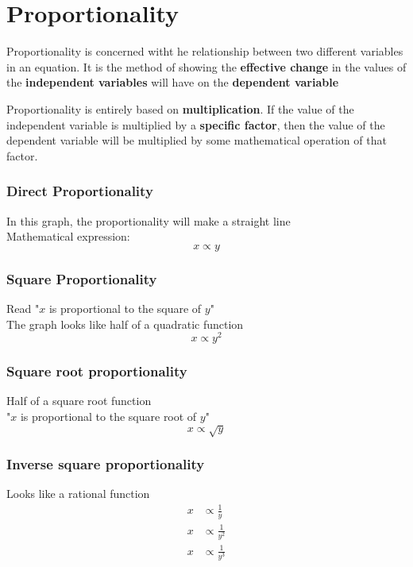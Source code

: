 \section{Proportionality}
\begin{definition}
    Proportionality is concerned witht he relationship between two different variables in an equation. It is the method 
    of showing the \textbf{effective change} in the values of the \textbf{independent variables} will have on the \textbf{dependent variable}
\end{definition}

Proportionality is entirely based on \textbf{multiplication}. If the value of the independent variable is multiplied by a 
\textbf{specific factor}, then the value of the dependent variable will be multiplied by some mathematical operation of that factor. 

\subsubsection*{Direct Proportionality}
In this graph, the proportionality will make a straight line\\

Mathematical expression:
\[
    x \propto y
\]

\subsubsection*{Square Proportionality}
Read "$x$ is proportional to the square of $y$"\\

The graph looks like half of a quadratic function\\

\[
    x \propto y^2
\]

\subsubsection*{Square root proportionality}
Half of a square root function\\

"$x$ is proportional to the square root of $y$"\\

\[
    x \propto \sqrt{y}
\]

\subsubsection*{Inverse square proportionality}
Looks like a rational function\\
\begin{align*}
    x &\propto \frac{1}{y}\\
    x &\propto \frac{1}{y^2}\\
    x &\propto \frac{1}{y^3}
\end{align*}
